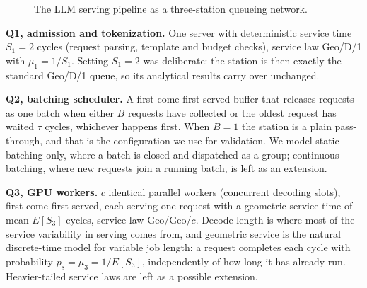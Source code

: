 \documentclass[11pt,a4paper]{article}
\begin{document}
\begin{figure}[H]
\centering
{}
\caption{The LLM serving pipeline as a three-station queueing network.}
\end{figure}

\textbf{Q1, admission and tokenization.} One server with deterministic service time
$S_1 = 2$ cycles (request parsing, template and budget checks), service law Geo/D/1
with $\mu_1 = 1/S_1$. Setting $S_1 = 2$ was deliberate: the station is then exactly
the standard Geo/D/1 queue, so its analytical results carry over unchanged.

\textbf{Q2, batching scheduler.} A first-come-first-served buffer that releases
requests as one batch when either $B$ requests have collected or the oldest request
has waited $\tau$ cycles, whichever happens first. When $B = 1$ the station is a
plain pass-through, and that is the configuration we use for validation. We model
static batching only, where a batch is closed and dispatched as a group; continuous
batching, where new requests join a running batch, is left as an extension.

\textbf{Q3, GPU workers.} $c$ identical parallel workers (concurrent decoding
slots), first-come-first-served, each serving one request with a geometric service
time of mean $E[S_3]$ cycles, service law Geo/Geo/$c$. Decode length is where most
of the service variability in serving comes from, and geometric service is the
natural discrete-time model for variable job length: a request completes each cycle
with probability $p_s = \mu_3 = 1/E[S_3]$, independently of how long it has already
run. Heavier-tailed service laws are left as a possible extension.
\end{document}
